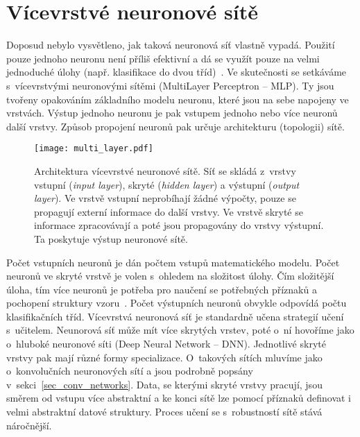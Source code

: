 
\section{Vícevrstvé neuronové sítě}
\label{sec_multilayer_networks}

Doposud nebylo vysvětleno, jak taková neuronová síť vlastně vypadá. Použití pouze jednoho neuronu není příliš efektivní a dá se využít pouze na velmi jednoduché úlohy (např. klasifikace do dvou tříd)~\cite{mendeluNeuralNetworks}. Ve skutečnosti se setkáváme s~vícevrstvými neuronovými sítěmi (MultiLayer Perceptron -- MLP). Ty jsou tvořeny opakováním základního modelu neuronu, které jsou na sebe napojeny ve vrstvách. Výstup jednoho neuronu je pak vstupem jednoho nebo více neuronů další vrstvy. Způsob propojení neuronů pak určuje architekturu (topologii) sítě.

\begin{figure}[H]
    \centering
    \texttt{[image: multi\_layer.pdf]}
    \caption[Architektura vícevrstvé neuronové sítě]{Architektura vícevrstvé neuronové sítě. Síť se skládá z~vrstvy vstupní (\textit{input layer}), skryté (\textit{hidden layer}) a výstupní (\textit{output layer}). Ve vrstvě vstupní neprobíhají žádné výpočty, pouze se propagují externí informace do další vrstvy. Ve vrstvě skryté se informace zpracovávají a poté jsou propagovány do vrstvy výstupní. Ta poskytuje výstup neuronové sítě.}
    \label{fig_multi_layer}
\end{figure}

Počet vstupních neuronů je dán počtem vstupů matematického modelu. Počet neuronů ve skryté vrstvě je volen s~ohledem na složitost úlohy. Čím složitější úloha, tím více neuronů je potřeba pro naučení se potřebných příznaků a pochopení struktury vzoru~\cite{mendeluNeuralNetworks}. Počet výstupních neuronů obvykle odpovídá počtu klasifikačních tříd. Vícevrstvá neuronová síť je standardně učena strategií učení s~učitelem. Neunorová síť může mít více skrytých vrstev, poté o~ní hovoříme jako o~hluboké neuronové síti (Deep Neural Network -- DNN). Jednotlivé skryté vrstvy pak mají různé formy specializace. O~takových sítích mluvíme jako o~konvolučních neuronových sítí a jsou podrobně popsány v~sekci~\ref{sec_conv_networks}. Data, se kterými skryté vrstvy pracují, jsou směrem od vstupu více abstraktní a ke konci sítě lze pomocí příznaků definovat i velmi abstraktní datové struktury. Proces učení se s~robustností sítě stává náročnější.

